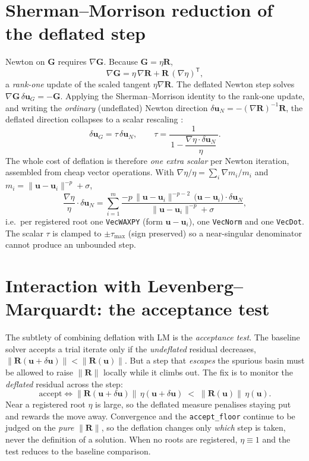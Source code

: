 \section{Sherman--Morrison reduction of the deflated step}

Newton on \(\mathbf{G}\) requires \(\nabla\mathbf{G}\). Because
\(\mathbf{G}=\eta\mathbf{R}\),
\[
  \nabla\mathbf{G}
   = \eta\,\nabla\mathbf{R}
   + \mathbf{R}\,(\nabla\eta)^{\mathsf T},
\]
a \emph{rank-one} update of the scaled tangent \(\eta\nabla\mathbf{R}\).
The deflated Newton step solves
\(\nabla\mathbf{G}\,\delta\mathbf{u}_G=-\mathbf{G}\). Applying the
Sherman--Morrison identity to the rank-one update, and writing the
\emph{ordinary} (undeflated) Newton direction
\(\delta\mathbf{u}_N=-(\nabla\mathbf{R})^{-1}\mathbf{R}\), the deflated
direction collapses to a scalar rescaling
\cite{FarrellBirkissonFunke2015}:
\[
  \boxed{\;\delta\mathbf{u}_G=\tau\,\delta\mathbf{u}_N,
  \qquad
  \tau=\frac{1}{\,1-\dfrac{\nabla\eta\cdot\delta\mathbf{u}_N}{\eta}\,}.\;}
\]
The whole cost of deflation is therefore \emph{one extra scalar} per
Newton iteration, assembled from cheap vector operations. With
\(\nabla\eta/\eta=\sum_i\nabla m_i/m_i\) and
\(m_i=\lVert\mathbf{u}-\mathbf{u}_i\rVert^{-p}+\sigma\),
\[
  \frac{\nabla\eta}{\eta}\cdot\delta\mathbf{u}_N
   =\sum_{i=1}^{m}
      \frac{-p\,\lVert\mathbf{u}-\mathbf{u}_i\rVert^{-p-2}\,
            \bigl(\mathbf{u}-\mathbf{u}_i\bigr)\cdot\delta\mathbf{u}_N}
           {\lVert\mathbf{u}-\mathbf{u}_i\rVert^{-p}+\sigma},
\]
i.e.\ per registered root one \texttt{VecWAXPY} (form
\(\mathbf{u}-\mathbf{u}_i\)), one \texttt{VecNorm} and one
\texttt{VecDot}. The scalar \(\tau\) is clamped to
\(\pm\tau_{\max}\) (sign preserved) so a near-singular denominator cannot
produce an unbounded step.

\section{Interaction with Levenberg--Marquardt: the acceptance test}

The subtlety of combining deflation with LM is the \emph{acceptance
test}. The baseline solver accepts a trial iterate only if the
\emph{undeflated} residual decreases, \(\lVert\mathbf{R}(\mathbf{u}
+\delta\mathbf{u})\rVert<\lVert\mathbf{R}(\mathbf{u})\rVert\). But a step
that \emph{escapes} the spurious basin must be allowed to raise
\(\lVert\mathbf{R}\rVert\) locally while it climbs out. The fix is to
monitor the \emph{deflated} residual across the step:
\[
  \text{accept}\iff
  \lVert\mathbf{R}(\mathbf{u}+\delta\mathbf{u})\rVert\,
    \eta(\mathbf{u}+\delta\mathbf{u})
  \;<\;
  \lVert\mathbf{R}(\mathbf{u})\rVert\,\eta(\mathbf{u}).
\]
Near a registered root \(\eta\) is large, so the deflated measure
penalises staying put and rewards the move away. Convergence and the
\texttt{accept\_floor} continue to be judged on the \emph{pure}
\(\lVert\mathbf{R}\rVert\), so the deflation changes only \emph{which}
step is taken, never the definition of a solution. When no roots are
registered, \(\eta\equiv1\) and the test reduces to the baseline
comparison.

